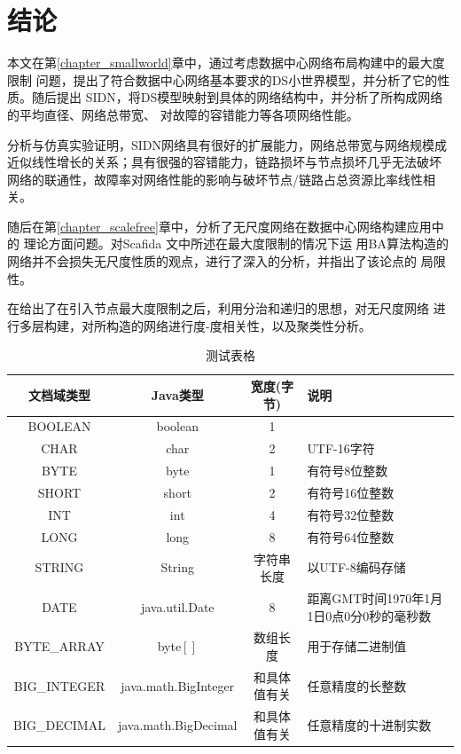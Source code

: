 \documentclass[master]{njuthesis}
\begin{document}
\chapter{结论}\label{chapter_concludes}

本文在第\ref{chapter_smallworld}章中，通过考虑数据中心网络布局构建中的最大度限制
问题，提出了符合数据中心网络基本要求的DS小世界模型，并分析了它的性质。随后提出
SIDN，将DS模型映射到具体的网络结构中，并分析了所构成网络的平均直径、网络总带宽、
对故障的容错能力等各项网络性能。

分析与仿真实验证明，SIDN网络具有很好的扩展能力，网络总带宽与网络规模成
近似线性增长的关系；具有很强的容错能力，链路损坏与节点损坏几乎无法破坏
网络的联通性，故障率对网络性能的影响与破坏节点/链路占总资源比率线性相关。

随后在第\ref{chapter_scalefree}章中，分析了无尺度网络在数据中心网络构建应用中的
理论方面问题。对Scafida \cite{gyarmati2010scafida}文中所述在最大度限制的情况下运
用BA算法构造的网络并不会损失无尺度性质的观点，进行了深入的分析，并指出了该论点的
局限性。

在给出了在引入节点最大度限制之后，利用分治和递归的思想，对无尺度网络
进行多层构建，对所构造的网络进行度-度相关性，以及聚类性分析。

\begin{table}
  \centering
  \begin{tabular}{cccp{38mm}}
    \toprule
    \textbf{文档域类型} & \textbf{Java类型} & \textbf{宽度(字节)} & \textbf{说明} \\
    \midrule
    BOOLEAN  & boolean &  1  & \\
    CHAR     & char    &  2  & UTF-16字符 \\
    BYTE     & byte    &  1  & 有符号8位整数 \\
    SHORT    & short   &  2  & 有符号16位整数 \\
    INT      & int     &  4  & 有符号32位整数 \\
    LONG     & long    &  8  & 有符号64位整数 \\
    STRING   & String  &  字符串长度  & 以UTF-8编码存储 \\
    DATE     & java.util.Date & 8 & 距离GMT时间1970年1月1日0点0分0秒的毫秒数 \\
    BYTE\_ARRAY & byte$[]$ & 数组长度 & 用于存储二进制值 \\
    BIG\_INTEGER & java.math.BigInteger & 和具体值有关 & 任意精度的长整数 \\
    BIG\_DECIMAL & java.math.BigDecimal & 和具体值有关 & 任意精度的十进制实数 \\
    \bottomrule
  \end{tabular}
  \caption{测试表格}\label{table:test5}
\end{table}
\end{document}
